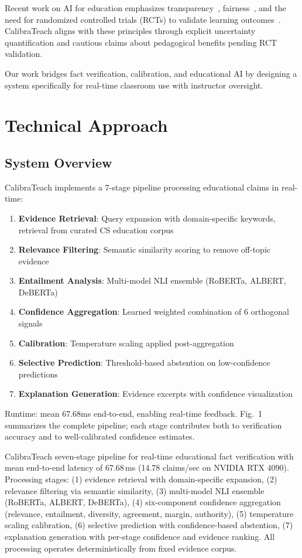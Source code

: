 Recent work on AI for education emphasizes transparency~, fairness~, and the need for randomized controlled trials (RCTs) to validate learning outcomes~. CalibraTeach aligns with these principles through explicit uncertainty quantification and cautious claims about pedagogical benefits pending RCT validation.

Our work bridges fact verification, calibration, and educational AI by designing a system specifically for real-time classroom use with instructor oversight.

\section{Technical Approach}\label{technical-approach}

\subsection{System Overview}\label{system-overview}

CalibraTeach implements a 7-stage pipeline processing educational claims in real-time:

\begin{enumerate}
\def\labelenumi{\arabic{enumi}.}
\item
  \textbf{Evidence Retrieval}: Query expansion with domain-specific keywords, retrieval from curated CS education corpus
\item
  \textbf{Relevance Filtering}: Semantic similarity scoring to remove off-topic evidence
\item
  \textbf{Entailment Analysis}: Multi-model NLI ensemble (RoBERTa, ALBERT, DeBERTa)
\item
  \textbf{Confidence Aggregation}: Learned weighted combination of 6 orthogonal signals
\item
  \textbf{Calibration}: Temperature scaling applied post-aggregation
\item
  \textbf{Selective Prediction}: Threshold-based abstention on low-confidence predictions
\item
  \textbf{Explanation Generation}: Evidence excerpts with confidence visualization
\end{enumerate}

Runtime: mean 67.68ms end-to-end, enabling real-time feedback. Fig.~1 summarizes the complete pipeline; each stage contributes both to verification accuracy and to well-calibrated confidence estimates.

CalibraTeach seven-stage pipeline for real-time educational fact verification with mean end-to-end latency of 67.68 ms (14.78 claims/sec on NVIDIA RTX 4090). Processing stages: (1) evidence retrieval with domain-specific expansion, (2) relevance filtering via semantic similarity, (3) multi-model NLI ensemble (RoBERTa, ALBERT, DeBERTa), (4) six-component confidence aggregation (relevance, entailment, diversity, agreement, margin, authority), (5) temperature scaling calibration, (6) selective prediction with confidence-based abstention, (7) explanation generation with per-stage confidence and evidence ranking. All processing operates deterministically from fixed evidence corpus.


